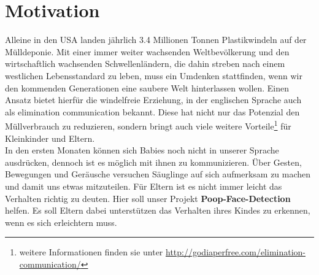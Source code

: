 \section{Motivation}
\label{sec:Motivation}
Alleine in den USA landen jährlich 3.4 Millionen Tonnen Plastikwindeln auf der Mülldeponie. Mit einer immer weiter wachsenden Weltbevölkerung und den wirtschaftlich wachsenden Schwellenländern, die dahin streben nach einem westlichen Lebensstandard zu leben,
muss ein Umdenken stattfinden, wenn wir den kommenden Generationen eine saubere Welt hinterlassen wollen. Einen Ansatz bietet hierfür die \glqq{}windelfreie Erziehung\grqq{}, in der englischen Sprache auch als \glqq{}elimination communication\grqq{} bekannt. Diese hat nicht nur das Potenzial den Müllverbrauch zu reduzieren, sondern bringt auch viele weitere Vorteile\footnote{ weitere Informationen finden sie unter \url{http://godiaperfree.com/elimination-communication/} } für Kleinkinder und Eltern. \\

In den ersten Monaten können sich Babies noch nicht in unserer Sprache ausdrücken, dennoch ist es möglich mit ihnen zu kommunizieren. Über Gesten, Bewegungen und Geräusche versuchen Säuglinge auf sich aufmerksam zu machen und damit uns etwas mitzuteilen. Für Eltern ist es nicht immer leicht das Verhalten richtig zu deuten. Hier soll unser Projekt \textbf{Poop-Face-Detection} helfen. Es soll Eltern dabei unterstützen das Verhalten ihres Kindes zu erkennen, wenn es sich erleichtern muss.
